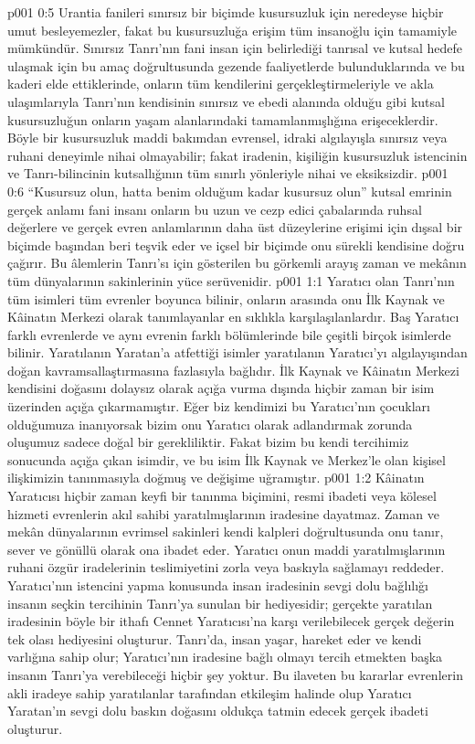 \vs p001 0:5 Urantia fanileri sınırsız bir biçimde kusursuzluk için neredeyse hiçbir umut besleyemezler, fakat bu kusursuzluğa erişim tüm insanoğlu için tamamiyle mümkündür. Sınırsız Tanrı’nın fani insan için belirlediği tanrısal ve kutsal hedefe ulaşmak için bu amaç doğrultusunda gezende faaliyetlerde bulunduklarında ve bu kaderi elde ettiklerinde, onların tüm kendilerini gerçekleştirmeleriyle ve akla ulaşımlarıyla Tanrı’nın kendisinin sınırsız ve ebedi alanında olduğu gibi kutsal kusursuzluğun onların yaşam alanlarındaki tamamlanmışlığına erişeceklerdir. Böyle bir kusursuzluk maddi bakımdan evrensel, idraki algılayışla sınırsız veya ruhani deneyimle nihai olmayabilir; fakat iradenin, kişiliğin kusursuzluk istencinin ve Tanrı\hyp{}bilincinin kutsallığının tüm sınırlı yönleriyle nihai ve eksiksizdir.
\vs p001 0:6 “Kusursuz olun, hatta benim olduğum kadar kusursuz olun” kutsal emrinin gerçek anlamı fani insanı onların bu uzun ve cezp edici çabalarında ruhsal değerlere ve gerçek evren anlamlarının daha üst düzeylerine erişimi için dışsal bir biçimde başından beri teşvik eder ve içsel bir biçimde onu sürekli kendisine doğru çağırır. Bu âlemlerin Tanrı’sı için gösterilen bu görkemli arayış zaman ve mekânın tüm dünyalarının sakinlerinin yüce serüvenidir.
\vs p001 1:1 Yaratıcı olan Tanrı’nın tüm isimleri tüm evrenler boyunca bilinir, onların arasında onu İlk Kaynak ve Kâinatın Merkezi olarak tanımlayanlar en sıklıkla karşılaşılanlardır. Baş Yaratıcı farklı evrenlerde ve aynı evrenin farklı bölümlerinde bile çeşitli birçok isimlerde bilinir. Yaratılanın Yaratan’a atfettiği isimler yaratılanın Yaratıcı’yı algılayışından doğan kavramsallaştırmasına fazlasıyla bağlıdır. İlk Kaynak ve Kâinatın Merkezi kendisini doğasını dolaysız olarak açığa vurma dışında hiçbir zaman bir isim üzerinden açığa çıkarmamıştır. Eğer biz kendimizi bu Yaratıcı’nın çocukları olduğumuza inanıyorsak bizim onu Yaratıcı olarak adlandırmak zorunda oluşumuz sadece doğal bir gerekliliktir. Fakat bizim bu kendi tercihimiz sonucunda açığa çıkan isimdir, ve bu isim İlk Kaynak ve Merkez’le olan kişisel ilişkimizin tanınmasıyla doğmuş ve değişime uğramıştır.
\vs p001 1:2 Kâinatın Yaratıcısı hiçbir zaman keyfi bir tanınma biçimini, resmi ibadeti veya kölesel hizmeti evrenlerin akıl sahibi yaratılmışlarının iradesine dayatmaz. Zaman ve mekân dünyalarının evrimsel sakinleri kendi kalpleri doğrultusunda onu tanır, sever ve gönüllü olarak ona ibadet eder. Yaratıcı onun maddi yaratılmışlarının ruhani özgür iradelerinin teslimiyetini zorla veya baskıyla sağlamayı reddeder. Yaratıcı’nın istencini yapma konusunda insan iradesinin sevgi dolu bağlılığı insanın seçkin tercihinin Tanrı’ya sunulan bir hediyesidir; gerçekte yaratılan iradesinin böyle bir ithafı Cennet Yaratıcısı’na karşı verilebilecek gerçek değerin tek olası hediyesini oluşturur. Tanrı’da, insan yaşar, hareket eder ve kendi varlığına sahip olur; Yaratıcı’nın iradesine bağlı olmayı tercih etmekten başka insanın Tanrı’ya verebileceği hiçbir şey yoktur. Bu ilaveten bu kararlar evrenlerin akli iradeye sahip yaratılanlar tarafından etkileşim halinde olup Yaratıcı Yaratan’ın sevgi dolu baskın doğasını oldukça tatmin edecek gerçek ibadeti oluşturur.
